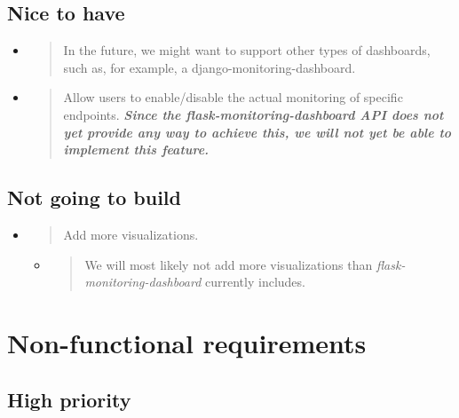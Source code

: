 \hypertarget{nice-to-have}{%
\subsection{Nice to have}\label{nice-to-have}}

\begin{itemize}
\item
  \begin{quote}
  In the future, we might want to support other types of dashboards,
  such as, for example, a django-monitoring-dashboard.
  \end{quote}
\item
  \begin{quote}
  Allow users to enable/disable the actual monitoring of specific
  endpoints. \emph{\textbf{Since the flask-monitoring-dashboard API does
  not yet provide any way to achieve this, we will not yet be able to
  implement this feature.}}
  \end{quote}
\end{itemize}

\hypertarget{not-going-to-build}{%
\subsection{Not going to build}\label{not-going-to-build}}

\begin{itemize}
\item
  \begin{quote}
  Add more visualizations.
  \end{quote}

  \begin{itemize}
  \item
    \begin{quote}
    We will most likely not add more visualizations than
    \emph{flask-monitoring-dashboard} currently includes.
    \end{quote}
  \end{itemize}
\end{itemize}

\hypertarget{non-functional-requirements}{%
\section{Non-functional
requirements}\label{non-functional-requirements}}

\hypertarget{high-priority-1}{%
\subsection{High priority}\label{high-priority-1}}

